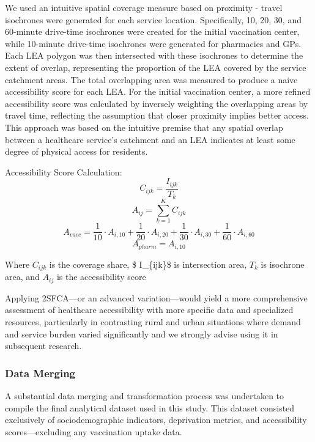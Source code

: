 \documentclass{article}
\begin{document}
We used an intuitive spatial coverage measure based on proximity -
travel isochrones were generated for each service location.
Specifically, 10, 20, 30, and 60-minute drive-time isochrones were
created for the initial vaccination center, while 10-minute drive-time
isochrones were generated for pharmacies and GPs. Each LEA polygon was
then intersected with these isochrones to determine the extent of
overlap, representing the proportion of the LEA covered by the service
catchment areas. The total overlapping area was measured to produce a
naive accessibility score for each LEA. For the initial vaccination
center, a more refined accessibility score was calculated by inversely
weighting the overlapping areas by travel time, reflecting the
assumption that closer proximity implies better access. This approach
was based on the intuitive premise that any spatial overlap between a
healthcare service's catchment and an LEA indicates at least some degree
of physical access for residents.

Accessibility Score Calculation: \[C_{ijk} = \frac{I_{ijk}}{T_k}\]
\[A_{ij} = \sum_{k=1}^{K} C_{ijk}\]
\[A_{vacc} = \frac{1}{10} \cdot A_{i,10} + \frac{1}{20} \cdot A_{i,20} + \frac{1}{30} \cdot A_{i,30} + \frac{1}{60} \cdot A_{i,60}\]
\[A_{pharm} = A_{i,10}\]

Where \(C_{ijk}\) is the coverage share, \$ I\_\{ijk\}\$ is intersection
area, \(T_k\) is isochrone area, and \(A_{ij}\) is the accessibility
score

Applying 2SFCA---or an advanced variation---would yield a more
comprehensive assessment of healthcare accessibility with more specific
data and specialized resources, particularly in contrasting rural and
urban situations where demand and service burden varied significantly
and we strongly advise using it in subsequent research.

\subsubsection{Data Merging}\label{data-merging}

A substantial data merging and transformation process was undertaken to
compile the final analytical dataset used in this study. This dataset
consisted exclusively of sociodemographic indicators, deprivation
metrics, and accessibility scores---excluding any vaccination uptake
data.
\end{document}
